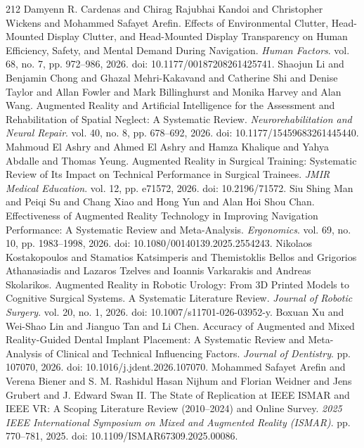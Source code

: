 \begin{thebibliography}{212}
 Damyenn R. Cardenas and Chirag Rajubhai Kandoi and Christopher Wickens and Mohammed Safayet Arefin. Effects of Environmental Clutter, Head-Mounted Display Clutter, and Head-Mounted Display Transparency on Human Efficiency, Safety, and Mental Demand During Navigation. \emph{Human Factors}. vol. 68, no. 7, pp. 972--986, 2026. doi: 10.1177/00187208261425741.
 Shaojun Li and Benjamin Chong and Ghazal Mehri-Kakavand and Catherine Shi and Denise Taylor and Allan Fowler and Mark Billinghurst and Monika Harvey and Alan Wang. Augmented Reality and Artificial Intelligence for the Assessment and Rehabilitation of Spatial Neglect: A Systematic Review. \emph{Neurorehabilitation and Neural Repair}. vol. 40, no. 8, pp. 678--692, 2026. doi: 10.1177/15459683261445440.
 Mahmoud El Ashry and Ahmed El Ashry and Hamza Khalique and Yahya Abdalle and Thomas Yeung. Augmented Reality in Surgical Training: Systematic Review of Its Impact on Technical Performance in Surgical Trainees. \emph{JMIR Medical Education}. vol. 12, pp. e71572, 2026. doi: 10.2196/71572.
 Siu Shing Man and Peiqi Su and Chang Xiao and Hong Yun and Alan Hoi Shou Chan. Effectiveness of Augmented Reality Technology in Improving Navigation Performance: A Systematic Review and Meta-Analysis. \emph{Ergonomics}. vol. 69, no. 10, pp. 1983--1998, 2026. doi: 10.1080/00140139.2025.2554243.
 Nikolaos Kostakopoulos and Stamatios Katsimperis and Themistoklis Bellos and Grigorios Athanasiadis and Lazaros Tzelves and Ioannis Varkarakis and Andreas Skolarikos. Augmented Reality in Robotic Urology: From 3D Printed Models to Cognitive Surgical Systems. A Systematic Literature Review. \emph{Journal of Robotic Surgery}. vol. 20, no. 1, 2026. doi: 10.1007/s11701-026-03952-y.
 Boxuan Xu and Wei-Shao Lin and Jianguo Tan and Li Chen. Accuracy of Augmented and Mixed Reality-Guided Dental Implant Placement: A Systematic Review and Meta-Analysis of Clinical and Technical Influencing Factors. \emph{Journal of Dentistry}. pp. 107070, 2026. doi: 10.1016/j.jdent.2026.107070.
 Mohammed Safayet Arefin and Verena Biener and S. M. Rashidul Hasan Nijhum and Florian Weidner and Jens Grubert and J. Edward Swan II. The State of Replication at {IEEE ISMAR} and {IEEE VR}: A Scoping Literature Review (2010--2024) and Online Survey. \emph{2025 IEEE International Symposium on Mixed and Augmented Reality (ISMAR)}. pp. 770--781, 2025. doi: 10.1109/ISMAR67309.2025.00086.

\end{thebibliography}
